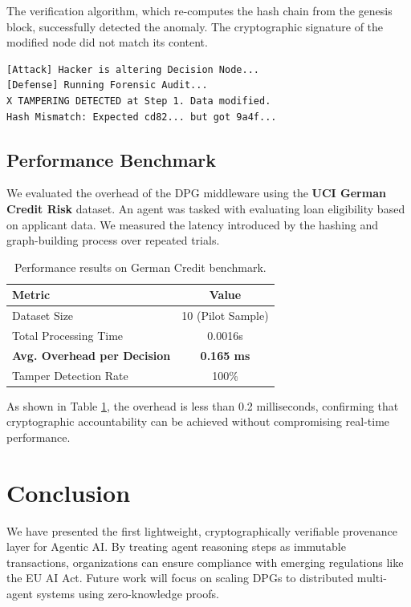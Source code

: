\documentclass[twocolumn]{article}
\begin{document}
The verification algorithm, which re-computes the hash chain from the genesis block, successfully detected the anomaly. The cryptographic signature of the modified node did not match its content.

\begin{lstlisting}[caption=Forensic Audit Log Output, label=lst:audit]
[Attack] Hacker is altering Decision Node...
[Defense] Running Forensic Audit...
X TAMPERING DETECTED at Step 1. Data modified.
Hash Mismatch: Expected cd82... but got 9a4f...
\end{lstlisting}

\subsection{Performance Benchmark}
We evaluated the overhead of the DPG middleware using the \textbf{UCI German Credit Risk} dataset. An agent was tasked with evaluating loan eligibility based on applicant data. We measured the latency introduced by the hashing and graph-building process over repeated trials.

\begin{table}[h]
\centering
\begin{tabular}{lc}
\toprule
\textbf{Metric} & \textbf{Value} \\
\midrule
Dataset Size & 10 (Pilot Sample) \\
Total Processing Time & 0.0016s \\
\textbf{Avg. Overhead per Decision} & \textbf{0.165 ms} \\
Tamper Detection Rate & 100\% \\
\bottomrule
\end{tabular}
\caption{Performance results on German Credit benchmark.}
\label{tab:results}
\end{table}

As shown in Table \ref{tab:results}, the overhead is less than 0.2 milliseconds, confirming that cryptographic accountability can be achieved without compromising real-time performance.

\section{Conclusion}
We have presented the first lightweight, cryptographically verifiable provenance layer for Agentic AI. By treating agent reasoning steps as immutable transactions, organizations can ensure compliance with emerging regulations like the EU AI Act. Future work will focus on scaling DPGs to distributed multi-agent systems using zero-knowledge proofs.
\end{document}
